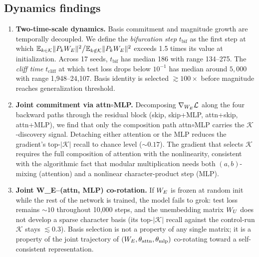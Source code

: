 \subsection{Dynamics findings}
\label{subsec:findings-dynamics}

\begin{enumerate}

\item \textbf{Two-time-scale dynamics.} Basis commitment and magnitude
  growth are temporally decoupled. We define the \emph{bifurcation step}
  $t_{\text{bif}}$ as the first step at which
  $\mathbb{E}_{k \in \mathcal K}\|P_k W_E\|^2 \big/
  \mathbb{E}_{k \notin \mathcal K}\|P_k W_E\|^2$
  exceeds 1.5 times its value at initialization. Across 17 seeds,
  $t_{\text{bif}}$ has median 186 with range 134--275. The
  \emph{cliff time} $t_{\text{cliff}}$ at which test loss drops below
  $10^{-1}$ has median around $5{,}000$ with range 1{,}948--24{,}107.
  Basis identity is selected $\gtrsim 100\times$ before magnitude
  reaches generalization threshold.

\item \textbf{Joint commitment via attn$\circ$MLP.} Decomposing
  $\nabla_{W_E} \mathcal L$ along the four backward paths through the
  residual block (skip, skip+MLP, attn+skip, attn+MLP), we find that
  only the composition path attn$\circ$MLP carries the
  $\mathcal K$-discovery signal. Detaching either attention or the MLP
  reduces the gradient's top-$|\mathcal K|$ recall to chance level
  ($\sim 0.17$). The gradient that selects $\mathcal K$ requires the
  full composition of attention with the nonlinearity, consistent with
  the algorithmic fact that modular multiplication needs both
  $(a, b)$-mixing (attention) and a nonlinear character-product step
  (MLP).

\item \textbf{Joint W\_E--(attn, MLP) co-rotation.} If $W_E$ is frozen
  at random init while the rest of the network is trained, the model
  fails to grok: test loss remains $\sim 10$ throughout 10{,}000 steps,
  and the unembedding matrix $W_U$ does not develop a sparse character
  basis (its top-$|\mathcal K|$ recall against the control-run
  $\mathcal K$ stays $\lesssim 0.3$). Basis selection is not a property
  of any single matrix; it is a property of the joint trajectory of
  $(W_E, \theta_{\text{attn}}, \theta_{\text{mlp}})$ co-rotating toward a
  self-consistent representation.


\end{enumerate}
